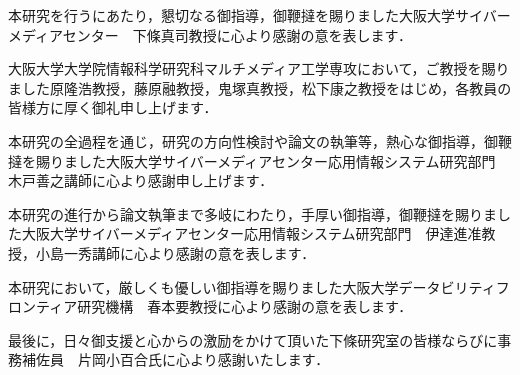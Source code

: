 \acknowledgement
本研究を行うにあたり，懇切なる御指導，御鞭撻を賜りました大阪大学サイバーメディアセンター　下條真司教授に心より感謝の意を表します．

大阪大学大学院情報科学研究科マルチメディア工学専攻において，ご教授を賜りました原隆浩教授，藤原融教授，鬼塚真教授，松下康之教授をはじめ，各教員の皆様方に厚く御礼申し上げます．

本研究の全過程を通じ，研究の方向性検討や論文の執筆等，熱心な御指導，御鞭撻を賜りました大阪大学サイバーメディアセンター応用情報システム研究部門　木戸善之講師に心より感謝申し上げます．

本研究の進行から論文執筆まで多岐にわたり，手厚い御指導，御鞭撻を賜りました大阪大学サイバーメディアセンター応用情報システム研究部門　伊達進准教授，小島一秀講師に心より感謝の意を表します．


本研究において，厳しくも優しい御指導を賜りました大阪大学データビリティフロンティア研究機構　春本要教授に心より感謝の意を表します．

最後に，日々御支援と心からの激励をかけて頂いた下條研究室の皆様ならびに事務補佐員　片岡小百合氏に心より感謝いたします．
